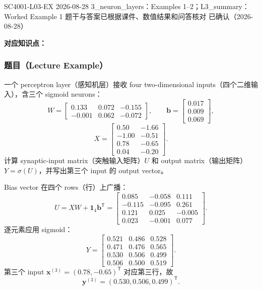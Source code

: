 

\examplemeta
  {SC4001-L03-EX}
  {2026-08-28}
  {3\_neuron\_layers：Examples 1--2；L3\_summary：Worked Example 1}
  {题干与答案已根据课件、数值结果和问答核对}
  {已确认（2026-08-28）}


\textbf{对应知识点：}

\subsubsection*{题目（Lecture Example）}

一个 perceptron layer（感知机层）接收 four two-dimensional inputs（四个二维输入），含三个 sigmoid neurons：
\[
  W=
  \begin{bmatrix}
    0.133&0.072&-0.155\\
    -0.001&0.062&-0.072
  \end{bmatrix},
  \qquad
  \bm b=
  \begin{bmatrix}0.017\\0.009\\0.069\end{bmatrix},
\]
\[
  X=
  \begin{bmatrix}
    0.50&-1.66\\
    -1.00&-0.51\\
    0.78&-0.65\\
    0.04&-0.20
  \end{bmatrix}.
\]
计算 synaptic-input matrix（突触输入矩阵）$U$ 和 output matrix（输出矩阵）$Y=\sigma(U)$，并写出第三个 input 的 output vector。

\begin{checkedsolution}
Bias vector 在四个 rows（行）上广播：
\[
  U=XW+\bm1_4\bm b^{\mathsf T}
  =
  \begin{bmatrix}
    0.085&-0.058&0.111\\
    -0.115&-0.095&0.261\\
    0.121&0.025&-0.005\\
    0.023&-0.001&0.077
  \end{bmatrix}.
\]
逐元素应用 sigmoid：
\[
  Y=
  \begin{bmatrix}
    0.521&0.486&0.528\\
    0.471&0.476&0.565\\
    0.530&0.506&0.499\\
    0.506&0.500&0.519
  \end{bmatrix}.
\]
第三个 input $\bm x^{(3)}=(0.78,-0.65)^{\mathsf T}$ 对应第三行，故
\[
  \boxed{\bm y^{(3)}=(0.530,0.506,0.499)^{\mathsf T}}.
\]
\end{checkedsolution}

